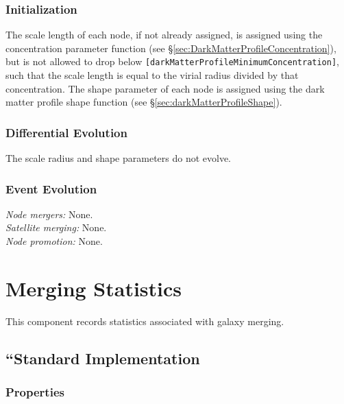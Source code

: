 \subsubsection{Initialization}

The scale length of each node, if not already assigned, is assigned using the concentration parameter function (see \S\ref{sec:DarkMatterProfileConcentration}), but is not allowed to drop below {\tt [darkMatterProfileMinimumConcentration]}, such that the scale length is equal to the virial radius divided by that concentration. The shape parameter of each node is assigned using the dark matter profile shape function (see \S\ref{sec:darkMatterProfileShape}).

\subsubsection{Differential Evolution}

The scale radius and shape parameters do not evolve.

\subsubsection{Event Evolution}

\noindent\emph{Node mergers:} None.\\

\noindent\emph{Satellite merging:} None.\\

\noindent\emph{Node promotion:} None.\\


\section{Merging Statistics}

This component records statistics associated with galaxy merging.

\subsection{``Standard Implementation}

\subsubsection{Properties}

